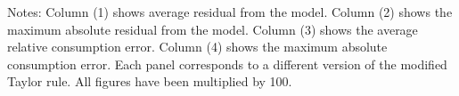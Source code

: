 \begin{table}[H]
\begin{tabular}{lccccrlccc}
    \bottomrule
    \end{tabular}
    \begin{minipage}{\linewidth}
    	\vspace{1mm}
		\footnotesize{{\sc Notes:} Column (1) shows average residual from the model. Column (2) shows the maximum absolute residual from the model. Column (3) shows the average relative consumption error. Column (4) shows the maximum absolute consumption error. Each panel corresponds to a different version of the modified Taylor rule. All figures have been multiplied by 100.}
	\end{minipage}
\end{table}